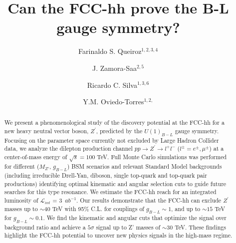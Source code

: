 \documentclass[aps,prev,twocolumn,preprintnumbers,floatfix,nofootinbib]{revtex4-1}
\begin{document}

\title{Can the FCC-hh prove the B-L gauge symmetry?}


\author{Farinaldo S. Queiroz$^{1,2,3,4}$}
\author{J. Zamora-Saa$^{2,5}$}
\author{Ricardo C. Silva$^{1,3,6}$}
\author{Y.M. Oviedo-Torres$^{1,2,}$}




\begin{abstract}

\noindent We present a phenomenological study of the discovery potential at the FCC-hh for a new heavy neutral vector boson, $Z^{\prime}$, predicted by the $U(1)_{B-L}$ gauge symmetry. Focusing on the parameter space currently not excluded by Large Hadron Collider data, we analyze the dilepton production channel $p p \rightarrow Z^{\prime} \rightarrow l^{+} l^{-}$ ($l^{\pm} = e^{\pm}, \mu^{\pm}$) at a center-of-mass energy of $\sqrt{s} = 100$ TeV. Full Monte Carlo simulations was performed for different ($M_{Z'}$, $g_{B-L}$) BSM scenarios and relevant Standard Model backgrounds (including irreducible Drell-Yan, diboson, single top-quark and top-quark pair productions) identifying optimal kinematic and angular selection cuts to guide future searches for this type resonance. We estimate the FCC-hh reach for an integrated luminosity of $\mathcal{L}_{int}$ = 3~$ab^{-1}$. Our results demonstrate that the FCC-hh can exclude $Z^{\prime}$ masses  up to $\sim 40$ TeV with 95\% C.L. for couplings of $g_{B-L} \sim 1$, and up to $\sim 15$ TeV for $g_{B-L} \sim 0.1$. We find the kinematic and angular cuts that optimize the signal over background ratio and achieve a $5\sigma$ signal up to Z' masses of $\sim 30$ TeV. These findings highlight the FCC-hh potential to uncover new physics signals in the high-mass regime.
\end{abstract} 
    
\end{document}
